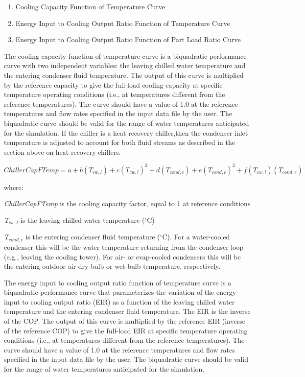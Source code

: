\begin{enumerate}
\item Cooling Capacity Function of Temperature Curve
\item Energy Input to Cooling Output Ratio Function of Temperature Curve
\item Energy Input to Cooling Output Ratio Function of Part Load Ratio Curve
\end{enumerate}

The cooling capacity function of temperature curve is a biquadratic performance curve with two independent variables: the leaving chilled water temperature and the entering condenser fluid temperature. The output of this curve is multiplied by the reference capacity to give the full-load cooling capacity at specific temperature operating conditions (i.e., at temperatures different from the reference temperatures). The curve should have a value of 1.0 at the reference temperatures and flow rates specified in the input data file by the user. The biquadratic curve should be valid for the range of water temperatures anticipated for the simulation. If the chiller is a heat recovery chiller,then the condenser inlet temperature is adjusted to account for both fluid streams as described in the section above on heat recovery chillers.

\begin{equation}
ChillerCapFTemp = a + b\left( {{T_{cw,l}}} \right) + c{\left( {{T_{cw,l}}} \right)^2} + d\left( {{T_{cond,e}}} \right) + e{\left( {{T_{cond,e}}} \right)^2} + f\left( {{T_{cw,l}}} \right)\left( {{T_{cond,e}}} \right)
\end{equation}

where:

\emph{ChillerCapFTemp} is the cooling capacity factor, equal to 1 at reference conditions

\emph{T\(_{cw,l}\)} is the leaving chilled water temperature (\(^{\circ}\)C)

\emph{T\(_{cond,e}\)} is the entering condenser fluid temperature (\(^{\circ}\)C). For a water-cooled condenser this will be the water temperature returning from the condenser loop (e.g., leaving the cooling tower). For air- or evap-cooled condensers this will be the entering outdoor air dry-bulb or wet-bulb temperature, respectively.

The energy input to cooling output ratio function of temperature curve is a biquadratic performance curve that parameterizes the variation of the energy input to cooling output ratio (EIR) as a function of the leaving chilled water temperature and the entering condenser fluid temperature. The EIR is the inverse of the COP. The output of this curve is multiplied by the reference EIR (inverse of the reference COP) to give the full-load EIR at specific temperature operating conditions (i.e., at temperatures different from the reference temperatures). The curve should have a value of 1.0 at the reference temperatures and flow rates specified in the input data file by the user. The biquadratic curve should be valid for the range of water temperatures anticipated for the simulation.

